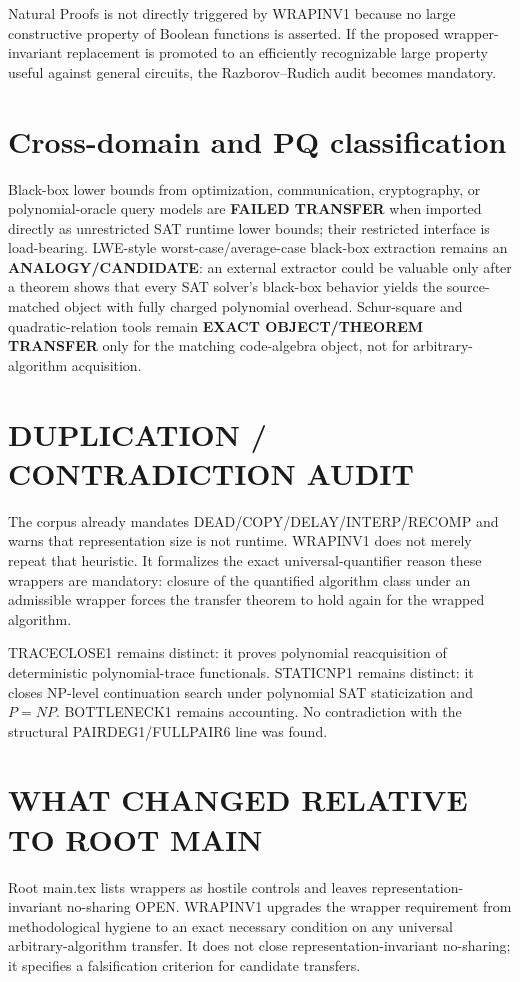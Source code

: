 \documentclass[11pt]{article}
\begin{document}
Natural Proofs is not directly triggered by WRAPINV1 because no large constructive property of Boolean functions is asserted. If the proposed wrapper-invariant replacement is promoted to an efficiently recognizable large property useful against general circuits, the Razborov--Rudich audit becomes mandatory.

\section*{Cross-domain and PQ classification}
Black-box lower bounds from optimization, communication, cryptography, or polynomial-oracle query models are \textbf{FAILED TRANSFER} when imported directly as unrestricted SAT runtime lower bounds; their restricted interface is load-bearing. LWE-style worst-case/average-case black-box extraction remains an \textbf{ANALOGY/CANDIDATE}: an external extractor could be valuable only after a theorem shows that every SAT solver's black-box behavior yields the source-matched object with fully charged polynomial overhead. Schur-square and quadratic-relation tools remain \textbf{EXACT OBJECT/THEOREM TRANSFER} only for the matching code-algebra object, not for arbitrary-algorithm acquisition.

\section*{DUPLICATION / CONTRADICTION AUDIT}
The corpus already mandates DEAD/COPY/DELAY/INTERP/RECOMP and warns that representation size is not runtime. WRAPINV1 does not merely repeat that heuristic. It formalizes the exact universal-quantifier reason these wrappers are mandatory: closure of the quantified algorithm class under an admissible wrapper forces the transfer theorem to hold again for the wrapped algorithm.

TRACECLOSE1 remains distinct: it proves polynomial reacquisition of deterministic polynomial-trace functionals. STATICNP1 remains distinct: it closes NP-level continuation search under polynomial SAT staticization and \(P=NP\). BOTTLENECK1 remains accounting. No contradiction with the structural PAIRDEG1/FULLPAIR6 line was found.

\section*{WHAT CHANGED RELATIVE TO ROOT MAIN}
Root main.tex lists wrappers as hostile controls and leaves representation-invariant no-sharing OPEN. WRAPINV1 upgrades the wrapper requirement from methodological hygiene to an exact necessary condition on any universal arbitrary-algorithm transfer. It does not close representation-invariant no-sharing; it specifies a falsification criterion for candidate transfers.
\end{document}
